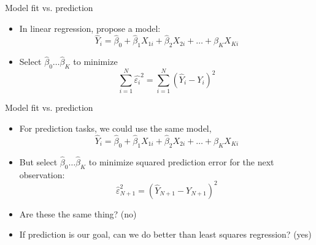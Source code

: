 \documentclass[xcolor={dvipsnames},handout]{beamer}
\begin{document}

\begin{frame}{Model fit vs. prediction}


\begin{itemize}
\item In linear regression, propose a model:
$$ \hat{Y}_i = \hat{\beta}_0 +  \hat{\beta}_1 X_{1i} + \hat{\beta}_2 X_{2i} + \dots + \hat{\beta}_K X_{Ki} $$
\item Select $\hat \beta_0 \dots \hat\beta_K$ to minimize
$$
\sum_{i = 1}^N \hat{\varepsilon_i}^2 = \sum_{i = 1}^N\left(\hat{Y}_i - Y_i\right)^2
$$
\end{itemize}

\end{frame}



\begin{frame}{Model fit vs. prediction}


\begin{itemize}
\item For prediction tasks, we could use the same model,
$$ \hat{Y}_i = \hat{\beta}_0 +  \hat{\beta}_1 X_{1i} + \hat{\beta}_2 X_{2i} + \dots + \hat{\beta}_K X_{Ki} $$
\item But select $\hat \beta_0 \dots \hat\beta_K$ to minimize squared prediction error for the next observation:
$$
\hat{\varepsilon}_{N+1}^2 = \left(\hat{Y}_{N + 1} - Y_{N +1}\right)^2
$$
\item Are these the same thing?  (no)
\item If prediction is our goal, can we do better than least squares regression?  (yes)
\end{itemize}

\end{frame}
\end{document}
